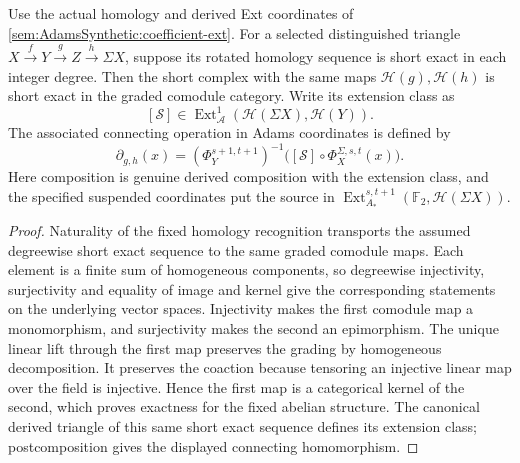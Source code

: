\begin{lemma}
\label{sem:AdamsSynthetic:homology-ext-boundary}
Use the actual homology and derived Ext coordinates of
\ref{sem:AdamsSynthetic:coefficient-ext}. For a selected distinguished
triangle $X\xrightarrow fY\xrightarrow gZ\xrightarrow h\Sigma X$,
suppose its rotated homology sequence is short exact in each integer degree.
Then the short complex with the same maps $\mathcal H(g),\mathcal H(h)$
is short exact in the graded comodule category. Write its extension class as
\[
 [\mathcal S]\in
 \operatorname{Ext}^1_{\mathcal A}(\mathcal H(\Sigma X),\mathcal H(Y)).
\]
The associated connecting operation in Adams coordinates is defined by
\[
 \partial_{g,h}(x)=(\Phi_Y^{s+1,t+1})^{-1}
 \bigl([\mathcal S]\circ\Phi_X^{\Sigma,s,t}(x)\bigr).
\]
Here composition is genuine derived composition with the extension class,
and the specified suspended coordinates put the source in
$\operatorname{Ext}^{s,t+1}_{A_*}(\mathbb F_2,\mathcal H(\Sigma X))$.
\end{lemma}
\begin{proof}
Naturality of the fixed homology recognition transports the assumed
degreewise short exact sequence to the same graded comodule maps.
Each element is a finite sum of homogeneous components, so degreewise
injectivity, surjectivity and equality of image and kernel give the
corresponding statements on the underlying vector spaces. Injectivity
makes the first comodule map a monomorphism, and surjectivity makes the
second an epimorphism. The unique linear lift through the first map
preserves the grading by homogeneous decomposition. It preserves the
coaction because tensoring an injective linear map over the field is
injective. Hence the first map is a categorical kernel of the second,
which proves exactness for the fixed abelian structure. The canonical
derived triangle of this same short exact sequence defines its extension
class; postcomposition gives the displayed connecting homomorphism.
\end{proof}

